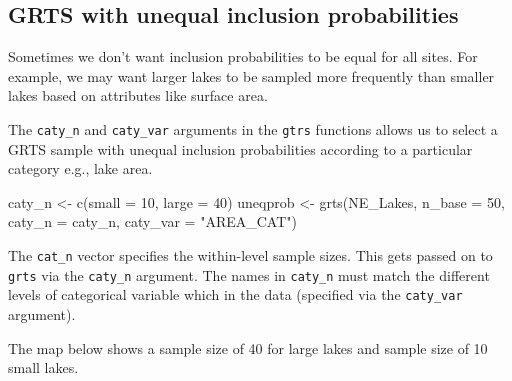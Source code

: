 \documentclass[
  letterpaper,
  DIV=11,
  numbers=noendperiod]{scrartcl}
\newenvironment{Shaded}{\begin{snugshade}}{\end{snugshade}}
\newcommand{\AttributeTok}[1]{\textcolor[rgb]{0.40,0.45,0.13}{#1}}
\newcommand{\DecValTok}[1]{\textcolor[rgb]{0.68,0.00,0.00}{#1}}
\newcommand{\FunctionTok}[1]{\textcolor[rgb]{0.28,0.35,0.67}{#1}}
\newcommand{\NormalTok}[1]{\textcolor[rgb]{0.00,0.23,0.31}{#1}}
\newcommand{\OtherTok}[1]{\textcolor[rgb]{0.00,0.23,0.31}{#1}}
\newcommand{\SpecialCharTok}[1]{\textcolor[rgb]{0.37,0.37,0.37}{#1}}
\newcommand{\StringTok}[1]{\textcolor[rgb]{0.13,0.47,0.30}{#1}}
\begin{document}
\subsection{GRTS with unequal inclusion
probabilities}\label{grts-with-unequal-inclusion-probabilities}

Sometimes we don't want inclusion probabilities to be equal for all
sites. For example, we may want larger lakes to be sampled more
frequently than smaller lakes based on attributes like surface area.

The \texttt{caty\_n} and \texttt{caty\_var} arguments in the
\texttt{gtrs} functions allows us to select a GRTS sample with unequal
inclusion probabilities according to a particular category e.g., lake
area.

\begin{Shaded}
\begin{Highlighting}[]
\NormalTok{caty\_n }\OtherTok{\textless{}{-}} \FunctionTok{c}\NormalTok{(}\AttributeTok{small =} \DecValTok{10}\NormalTok{, }\AttributeTok{large =} \DecValTok{40}\NormalTok{)}
\NormalTok{uneqprob }\OtherTok{\textless{}{-}} \FunctionTok{grts}\NormalTok{(NE\_Lakes, }\AttributeTok{n\_base =} \DecValTok{50}\NormalTok{, }\AttributeTok{caty\_n =}\NormalTok{ caty\_n, }\AttributeTok{caty\_var =} \StringTok{"AREA\_CAT"}\NormalTok{)}
\end{Highlighting}
\end{Shaded}

The \texttt{cat\_n} vector specifies the within-level sample sizes. This
gets passed on to \texttt{grts} via the \texttt{caty\_n} argument. The
names in \texttt{caty\_n} must match the different levels of categorical
variable which in the data (specified via the \texttt{caty\_var}
argument).

The map below shows a sample size of 40 for large lakes and sample size
of 10 small lakes.

\begin{Shaded}
\end{Shaded}
\end{document}

